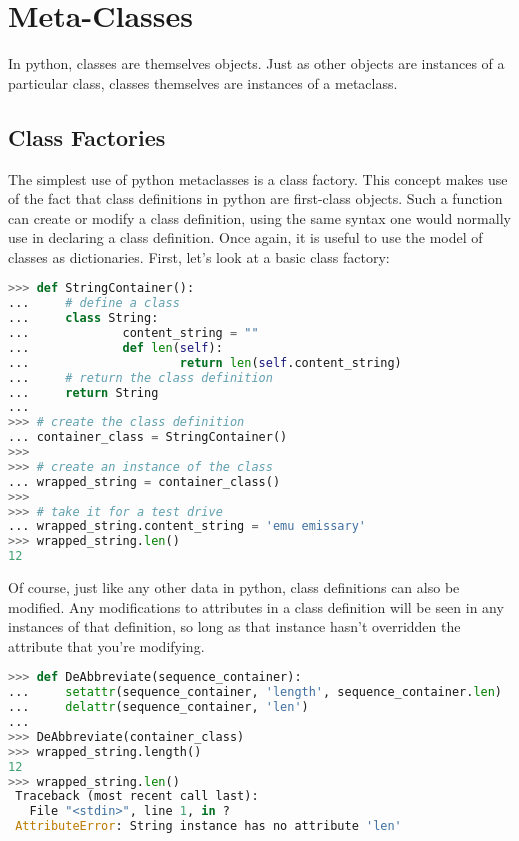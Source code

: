 \section{Meta-Classes}
In python, classes are themselves objects. Just as other objects are instances
of a particular class, classes themselves are instances of a metaclass.

\subsection{Class Factories}
The simplest use of python metaclasses is a class factory. This concept makes
use of the fact that class definitions in python are first-class objects. Such a
function can create or modify a class definition, using the same syntax one
would normally use in declaring a class definition. Once again, it is useful to
use the model of classes as dictionaries. First, let's look at a basic class
factory:
\lstset{basicstyle=\scriptsize, numbers=left, captionpos=b, tabsize=4}
\begin{lstlisting}[caption=Class Factory,language={Python},
xleftmargin=15pt, label=lst:]
>>> def StringContainer():
...     # define a class
...     class String:
...             content_string = ""
...             def len(self):
...                     return len(self.content_string)
...     # return the class definition
...     return String
...
>>> # create the class definition
... container_class = StringContainer()
>>>
>>> # create an instance of the class
... wrapped_string = container_class()
>>>
>>> # take it for a test drive
... wrapped_string.content_string = 'emu emissary'
>>> wrapped_string.len()
12
\end{lstlisting}

Of course, just like any other data in python, class definitions can also be
modified. Any modifications to attributes in a class definition will be seen in
any instances of that definition, so long as that instance hasn't overridden the
attribute that you're modifying.
\lstset{basicstyle=\scriptsize, numbers=left, captionpos=b, tabsize=4}
\begin{lstlisting}[caption=Attribute Constructor,language={Python},
xleftmargin=15pt, label=lst:attributeconstructor]
>>> def DeAbbreviate(sequence_container):
...     setattr(sequence_container, 'length', sequence_container.len)
...     delattr(sequence_container, 'len')
...
>>> DeAbbreviate(container_class)
>>> wrapped_string.length()
12
>>> wrapped_string.len()
 Traceback (most recent call last):
   File "<stdin>", line 1, in ?
 AttributeError: String instance has no attribute 'len'
\end{lstlisting}

